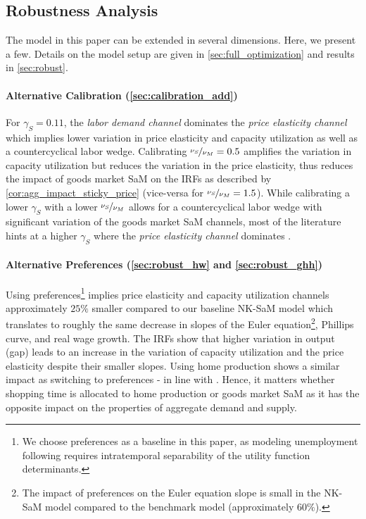 \documentclass[12pt,3p,authoryear,review]{elsarticle}
\begin{document}
\subsection{Robustness Analysis}\label{sec:robust_sim}%
The model in this paper can be extended in several dimensions. Here, we present a few. Details on the model setup are given in \ref{sec:full_optimization} and results in \ref{sec:robust}.%
\paragraph{Alternative Calibration (\ref{sec:calibration_add})}%
For $\gamma_S = 0.11$, the \emph{labor demand channel} dominates the \emph{price elasticity channel} which implies lower variation in price elasticity and capacity utilization as well as a countercyclical labor wedge. Calibrating $\nicefrac{\nu_S}{\nu_M} = 0.5$ amplifies the variation in capacity utilization but reduces the variation in the price elasticity, thus reduces the impact of goods market SaM on the IRFs as described by \cref{cor:agg_impact_sticky_price} (vice-versa for $\nicefrac{\nu_S}{\nu_M} = 1.5$). While calibrating a lower $\gamma_S$ with a lower $\nicefrac{\nu_S}{\nu_M}$ allows for a countercyclical labor wedge with significant variation of the goods market SaM channels, most of the literature hints at a higher $\gamma_S$ where the \emph{price elasticity channel} dominates \citep{bai2025demand,den2024role,michaillatAggregateDemandIdle2015,qiuProcyclicalProductivityNew2022}.%
\paragraph{Alternative Preferences (\ref{sec:robust_hw} and \ref{sec:robust_ghh})}%
Using \cite{greenwoodInvestmentCapacityUtilization1988} preferences\footnote{We choose \cite{kingProductionGrowthBusiness1988} preferences as a baseline in this paper, as modeling unemployment following \cite{gali2011unemployment} requires intratemporal separability of the utility function determinants.} implies price elasticity and capacity utilization channels approximately $25\%$ smaller compared to our baseline NK-SaM model which translates to roughly the same decrease in slopes of the Euler equation\footnote{The impact of \cite{greenwoodInvestmentCapacityUtilization1988} preferences on the Euler equation slope is small in the NK-SaM model compared to the benchmark model (approximately $60\%$).}, Phillips curve, and real wage growth. The IRFs show that higher variation in output (gap) leads to an increase in the variation of capacity utilization and the price elasticity despite their smaller slopes. Using home production shows a similar impact as switching to \cite{greenwoodInvestmentCapacityUtilization1988} preferences - in line with \cite{lesterHomeProductionSticky2014}. Hence, it matters whether shopping time is allocated to home production or goods market SaM as it has the opposite impact on the properties of aggregate demand and supply.%
\end{document}
